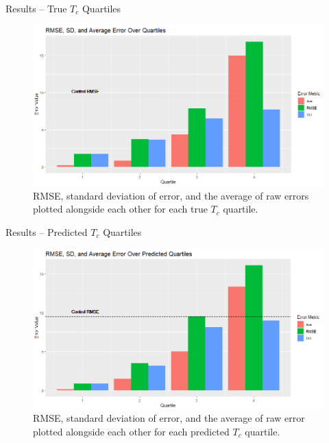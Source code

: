 \documentclass{beamer}
\begin{document}
  \begin{frame}{Results -- True $T_c$ Quartiles}
    \begin{figure}
        \centering
        \includegraphics[width = 0.8\linewidth]{True_Q_Ave_brplt.png}
        \caption{RMSE, standard deviation of error, and the average of raw errors plotted alongside each other for each true $T_c$ quartile.}
        \label{fig:true_tc_q_brplt}
    \end{figure}
  \end{frame}
  
  \begin{frame}{Results -- Predicted $T_c$ Quartiles}
      \begin{figure}
          \centering
          \includegraphics[width = 0.8\linewidth]{Pred_Q_Ave_brplt.png}
          \caption{RMSE, standard deviation of error, and the average of raw error plotted alongside each other for each predicted $T_c$ quartile.}
          \label{fig:pred_tc_q_brplt}
      \end{figure}
  \end{frame}
  
\end{document}
